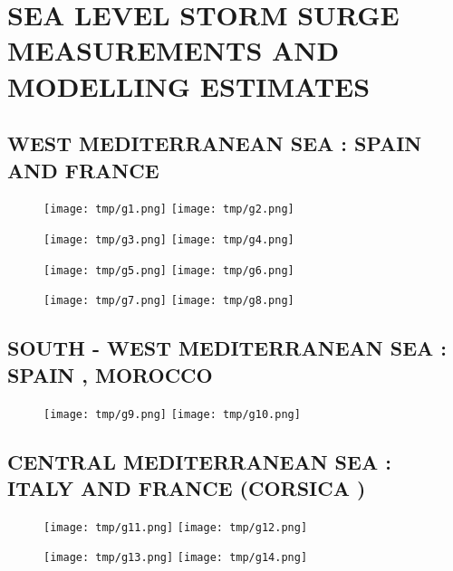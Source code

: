 \documentclass[a4paper]{article}
\renewcommand{\\}{\ {\large\textperiodcentered}\ }
\renewcommand{\\}{\ {\large\textperiodcentered}\ }
\begin{document}
\newpage


\section*{SEA LEVEL STORM SURGE MEASUREMENTS AND MODELLING ESTIMATES}

\subsection*{WEST MEDITERRANEAN SEA : SPAIN AND FRANCE}

\begin{figure}[h]
\centerline{
\texttt{[image: tmp/g1.png]}
\texttt{[image: tmp/g2.png]}
}
\end{figure}

\begin{figure}[h]
\centerline{
\texttt{[image: tmp/g3.png]}
\texttt{[image: tmp/g4.png]}
}
\end{figure}

\begin{figure}[h]
\centerline{
\texttt{[image: tmp/g5.png]}
\texttt{[image: tmp/g6.png]}
}
\end{figure}

\begin{figure}[h]
\centerline{
\texttt{[image: tmp/g7.png]}
\texttt{[image: tmp/g8.png]}
}
\end{figure}

\newpage

\subsection*{SOUTH - WEST MEDITERRANEAN SEA : SPAIN , MOROCCO}

\begin{figure}[h]
\centerline{
\texttt{[image: tmp/g9.png]}
\texttt{[image: tmp/g10.png]}
}
\end{figure}

\newpage

\subsection*{CENTRAL MEDITERRANEAN SEA : ITALY AND FRANCE (CORSICA )}

\begin{figure}[h]
\centerline{
\texttt{[image: tmp/g11.png]}
\texttt{[image: tmp/g12.png]}
}
\end{figure}

\begin{figure}[h]
\centerline{
\texttt{[image: tmp/g13.png]}
\texttt{[image: tmp/g14.png]}
}
\end{figure}
\end{document}
